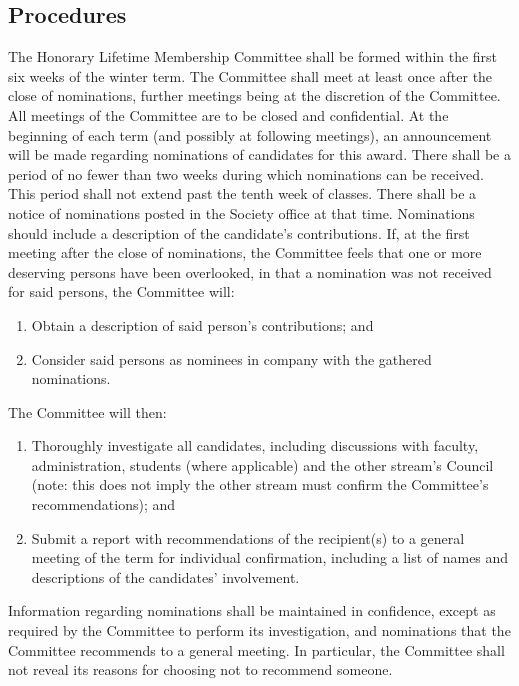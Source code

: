 \subsection{Procedures}
The Honorary Lifetime Membership Committee shall be formed within the first six weeks of the winter term. The Committee shall meet at least once after the close of nominations, further meetings being at the discretion of the Committee. All meetings of the Committee are to be closed and confidential.
At the beginning of each term (and possibly at following meetings), an announcement will be made regarding nominations of candidates for this award.
There shall be a period of no fewer than two weeks during which nominations can be received. This period shall not extend past the tenth week of classes. There shall be a notice of nominations posted in the Society office at that time. Nominations should include a description of the candidate's contributions.
If, at the first meeting after the close of nominations, the Committee feels that one or more deserving persons have been overlooked, in that a nomination was not received for said persons, the Committee will:
\begin{enumerate}
\item Obtain a description of said person's contributions; and
\item Consider said persons as nominees in company with the gathered nominations.
\end{enumerate}
The Committee will then:
\begin{enumerate}
\item Thoroughly investigate all candidates, including discussions with faculty, administration, students (where applicable) and the other stream's Council (note: this does not imply the other stream must confirm the Committee's recommendations); and
\item Submit a report with recommendations of the recipient(s) to a general meeting of the term for individual confirmation, including a list of names and descriptions of the candidates' involvement.
\end{enumerate}
Information regarding nominations shall be maintained in confidence, except as required by the Committee to perform its investigation, and nominations that the Committee recommends to a general meeting. In particular, the Committee shall not reveal its reasons for choosing not to recommend someone.

